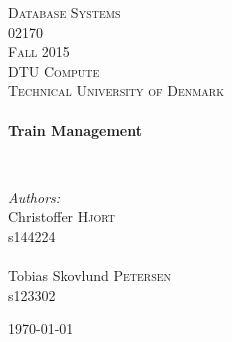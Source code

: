 \begin{titlepage}
    \begin{center}
        
        
        \textsc{\Large Database Systems \\
            02170 \\ 
            Fall 2015 \\ 
            DTU Compute \\ 
            Technical University of Denmark}\\[1.5cm]
        
        
        \HRule \\[0.4cm]
        { \huge \bfseries Train Management \\[0.4cm] }
        
        \HRule \\[1.5cm]
        
        \begin{center}
            \begin{minipage}{0.5\textwidth}
                \begin{flushleft} \large
                    \emph{Authors:}\\
                    Christoffer \textsc{Hjort} \\
                    s144224 \\ ~\\
                    Tobias Skovlund \textsc{Petersen} \\
                    s123302
                \end{flushleft}
            \end{minipage}
        \end{center}
        
        \vfill
        
        {\large \today}
        
    \end{center}
\end{titlepage}